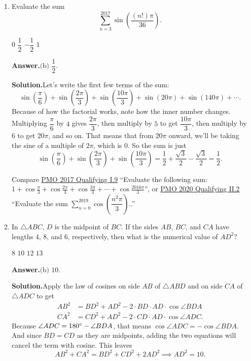 \documentclass[11pt,paper=letter]{scrartcl}
\newcommand{\ans}{{\sffamily \bfseries Answer.}\;}
\newcommand{\ansb}[2]{\ans\(\boxed{\text{(#1) #2}}\).}
\newcommand{\sol}{{\sffamily \bfseries Solution.}\;}
\newenvironment{rem}%
{\noindent \ignorespaces \small \sffamily \sansmath {\bfseries Remark.}}%
{\ignorespacesafterend}
\begin{document}
\begin{enumerate}[left=0pt]
\item Evaluate the sum \[
  \sum_{n=3}^{2017} \sin\left(\dfrac{(n!)\pi}{36}\right).
\]

\fourch
{$0$}
{$\dfrac{1}{2}$}
{$-\dfrac{1}{2}$}
{$1$}

\ansb{b}{$\dfrac{1}{2}$}

\sol Let's write the first few terms of the sum: \[
  \sin\left(\frac{\pi}{6}\right) + \sin\left(\frac{2\pi}{3}\right) + \sin\left(\frac{10\pi}{3}\right) + \sin\left(20\pi\right) + \sin\left(140\pi\right) + \cdots.
\]
Because of how the factorial works, note how the inner number changes. Multiplying $\dfrac{\pi}{6}$ by $4$ gives $\dfrac{2\pi}{3}$, then multiply by $5$ to get $\dfrac{10\pi}{3}$, then multiply by $6$ to get $20\pi$, and so on. That means that from $20\pi$ onward, we'll be taking the sine of a multiple of $2\pi$, which is $0$. So the sum is just \[
  \sin\left(\frac{\pi}{6}\right) + \sin\left(\frac{2\pi}{3}\right) + \sin\left(\frac{10\pi}{3}\right) = \frac{1}{2} + \frac{\sqrt{3}}{2} - \frac{\sqrt{3}}{2} = \frac{1}{2}.
\]

\begin{rem}
Compare \href{http://pmo.ph/wp-content/uploads/2014/08/19th-PMO-Qualifying-Stage-Questions-and-Answers.pdf}{PMO 2017 Qualifying I.9} ``Evaluate the following sum: $1 + \cos\frac\pi3 + \cos\frac{2\pi}3 + \cos\frac{3\pi}3 + \cdots + \cos\frac{2016\pi}3$'', or \href{https://cjquines.com/files/pmo2020quals.pdf}{PMO 2020 Qualifying II.2} ``Evaluate the sum $\sum_{n=0}^{2019}\cos\left(\dfrac{n^2\pi}{3}\right).$.''
\end{rem}

\item In $\triangle ABC$, $D$ is the midpoint of $BC$. If the sides $AB$, $BC$, and $CA$ have lengths $4$, $8$, and $6$, respectively, then what is the numerical value of $AD^2$?

\fourch
{$8$}
{$10$}
{$12$}
{$13$}

\ansb{b}{$10$}

\sol Apply the law of cosines on side $AB$ of $\triangle ABD$ and on side $CA$ of $\triangle ADC$ to get
\begin{align*}
AB^2 &= BD^2 + AD^2 - 2 \cdot BD \cdot AD \cdot \cos \angle BDA \\
CA^2 &= CD^2 + AD^2 - 2 \cdot CD \cdot AD \cdot \cos \angle ADC.
\end{align*}
Because $\angle ADC = 180^\circ - \angle BDA$, that means $\cos \angle ADC = - \cos \angle BDA$. And since $BD = CD$ as they are midpoints, adding the two equations will cancel the term with cosine. This leaves \[
  AB^2 + CA^2 = BD^2 + CD^2 + 2AD^2 \implies AD^2 = 10.
\]


\end{enumerate}
\end{document}
